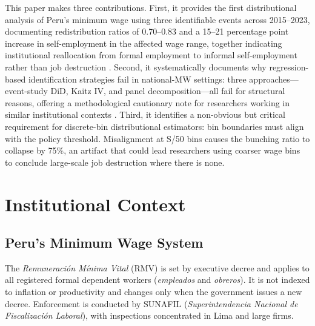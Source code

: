 \documentclass[12pt]{article}
\begin{document}
This paper makes three contributions. First, it provides the first distributional analysis of Peru's minimum wage using three identifiable events across 2015--2023, documenting redistribution ratios of 0.70--0.83 and a 15--21 percentage point increase in self-employment in the affected wage range, together indicating institutional reallocation from formal employment to informal self-employment rather than job destruction \citep[contributing to][]{harasztosi2016, saltiel2018, gindling2021, engbom2022, corcuera2024}. Second, it systematically documents why regression-based identification strategies fail in national-MW settings: three approaches---event-study DiD, Kaitz IV, and panel decomposition---all fail for structural reasons, offering a methodological cautionary note for researchers working in similar institutional contexts \citep{card1994, neumark2022, manning2021, dube2019, belman2014}. Third, it identifies a non-obvious but critical requirement for discrete-bin distributional estimators: bin boundaries must align with the policy threshold. Misalignment at S/50 bins causes the bunching ratio to collapse by 75\%, an artifact that could lead researchers using coarser wage bins to conclude large-scale job destruction where there is none.

\section{Institutional Context}\label{sec:context}

\subsection{Peru's Minimum Wage System}

The \textit{Remuneraci\'on M\'inima Vital} (RMV) is set by executive decree and applies to all registered formal dependent workers (\textit{empleados} and \textit{obreros}). It is not indexed to inflation or productivity and changes only when the government issues a new decree. Enforcement is conducted by SUNAFIL (\textit{Superintendencia Nacional de Fiscalizaci\'on Laboral}), with inspections concentrated in Lima and large firms.
\end{document}

